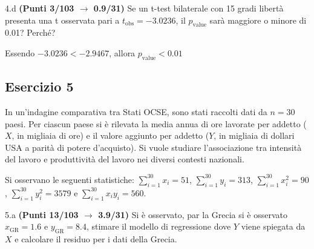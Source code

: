\documentclass[
  11pt,
]{book}
\theoremstyle{mytheoremstyle}
\theoremstyle{mydefstyle}
\newenvironment{sol}
  {
  \begin{tcolorbox}[enhanced,breakable,arc=0.1mm,boxrule=1pt,colback=white,colframe=iblue,
  title=\bf \fontfamily{lmss}\selectfont \hspace{.5 cm} Soluzione,drop fuzzy shadow]

}{
\end{tcolorbox}
  }
\begin{document}
4.d \textbf{(Punti 3/103 \(\rightarrow\) 0.9/31)} Se un t-test bilaterale con 15 gradi libertà presenta una
t osservata pari a \(t_\text{obs}=-3.0236\), il \(p_\text{value}\) sarà maggiore o minore di 0.01? Perché?

\begin{sol}
Essendo \(-3.0236< -2.9467\), allora
\(p_\text{value}<0.01\)

\end{sol}

\subsection{Esercizio 5}\label{esercizio-5-48}

In un'indagine comparativa tra Stati OCSE, sono stati raccolti dati da \(n = 30\) paesi. Per ciascun paese si è rilevata la media annua di ore lavorate per addetto (\(X\), in migliaia di ore) e il valore aggiunto per addetto (\(Y\), in migliaia di dollari USA a parità di potere d'acquisto). Si vuole studiare l'associazione tra intensità del lavoro e produttività del lavoro nei diversi contesti nazionali.

Si osservano le seguenti statistiche:
\(\sum_{i=1}^{30}x_i=51\), \(\sum_{i=1}^{30}y_i=313\),
\(\sum_{i=1}^{30}x_i^2=90\), \(\sum_{i=1}^{30}y_i^2=3579\) e \(\sum_{i=1}^{30}x_iy_i=560\).

5.a \textbf{(Punti 13/103 \(\rightarrow\) 3.9/31)} Si è osservato, par la Grecia si è osservato \(x_{\text{GR}}=1.6\) e \(y_{\text{GR}}=8.4\), stimare il modello di regressione dove \(Y\) viene spiegata da \(X\) e calcolare il residuo per i dati della Grecia.
\end{document}
